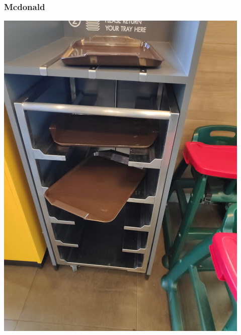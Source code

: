 \documentclass{beamer}
\begin{document}
\begin{frame}
\frametitle{Mcdonald}
%
\centering
\includegraphics[width=0.45\linewidth]{mc}

\end{frame}
\end{document}
